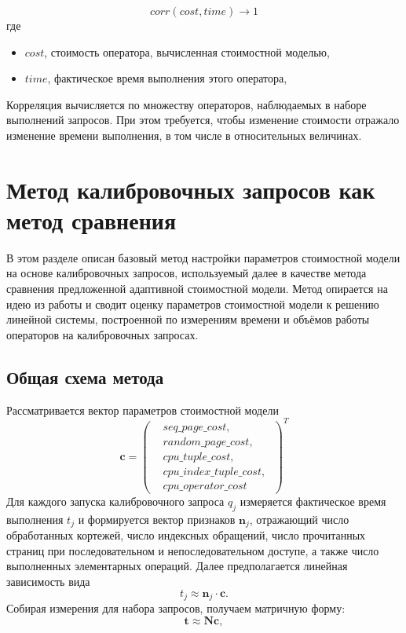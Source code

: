 \begin{equation}
    corr(cost, time) \rightarrow 1
\end{equation}
где
\begin{itemize}
    \item \(cost\), стоимость оператора, вычисленная стоимостной моделью,
    \item \(time\), фактическое время выполнения этого оператора,
\end{itemize}

Корреляция вычисляется по множеству операторов, наблюдаемых в наборе выполнений запросов. При этом требуется, чтобы изменение стоимости отражало изменение времени выполнения, в том числе в относительных величинах.

\section{Метод калибровочных запросов как метод сравнения}\label{sec:ch2/sec3}
В этом разделе описан базовый метод настройки параметров стоимостной модели на основе калибровочных запросов, используемый далее в качестве метода сравнения предложенной адаптивной стоимостной модели. Метод опирается на идею из работы \cite{10.1109/ICDE.2013.6544899} и сводит оценку параметров стоимостной модели к решению линейной системы, построенной по измерениям времени и объёмов работы операторов на калибровочных запросах.

\subsection{Общая схема метода}

Рассматривается вектор параметров стоимостной модели
\[
\mathbf{c} =
\left(
\begin{aligned}
&seq\_page\_cost,\; \\
&random\_page\_cost,\; \\
&cpu\_tuple\_cost,\\
&cpu\_index\_tuple\_cost,\; \\ 
&cpu\_operator\_cost
\end{aligned}
\right)^{T}
\]
Для каждого запуска калибровочного запроса \(q_j\) измеряется фактическое время выполнения \(t_j\) и формируется вектор признаков \(\mathbf{n}_j\), отражающий число обработанных кортежей, число индексных обращений, число прочитанных страниц при последовательном и непоследовательном доступе, а также число выполненных элементарных операций. Далее предполагается линейная зависимость вида
\begin{equation}
t_j \approx \mathbf{n}_j \cdot \mathbf{c}.
\end{equation}
Собирая измерения для набора запросов, получаем матричную форму:
\begin{equation}
\mathbf{t} \approx \mathbf{N}\mathbf{c},
\end{equation}

